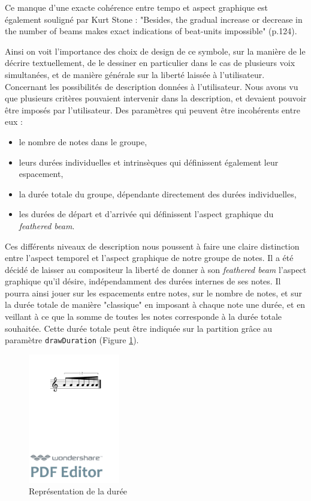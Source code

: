 \documentclass{article}
\newenvironment{gmncode}	{\vspace{-2mm}\small\verbatim}{\endverbatim\vspace{-2mm}}
\newcommand{\code}[1]		{{\small \texttt{#1}}}
\begin{document}
Ce manque d'une exacte cohérence entre tempo et aspect graphique est également souligné par Kurt Stone \cite{stone1980music} : "Besides, the gradual increase or decrease in the number of beams makes exact indications of beat-units impossible" (p.124).

Ainsi on voit l'importance des choix de design de ce symbole, sur la manière de le décrire textuellement, de le dessiner en particulier dans le cas de plusieurs voix simultanées, et de manière générale sur la liberté laissée à l'utilisateur.
\\

Concernant les possibilités de description données à l'utilisateur. Nous avons vu que plusieurs critères pouvaient intervenir dans la description, et devaient pouvoir être imposés par l'utilisateur. Des paramètres qui peuvent être incohérents entre eux :
\begin{itemize}
\item le nombre de notes dans le groupe,
\item leurs durées individuelles et intrinsèques qui définissent également leur espacement,
\item la durée totale du groupe, dépendante directement des durées individuelles,
\item les durées de départ et d'arrivée qui définissent l'aspect graphique du \emph{feathered beam}.
\end{itemize}
\bigskip

Ces différents niveaux de description nous poussent à faire une claire distinction entre l'aspect temporel et l'aspect graphique de notre groupe de notes.  Il a été décidé de laisser au compositeur la liberté de donner à son \emph{feathered beam} l'aspect graphique qu'il désire, indépendamment des durées internes de ses notes. Il pourra ainsi jouer sur les espacements entre notes, sur le nombre de notes, et sur la durée totale de manière "classique" en imposant à chaque note une durée, et en veillant à ce que la somme de toutes les notes corresponde à la durée totale souhaitée. Cette durée totale peut être indiquée sur la partition grâce au paramètre \code{drawDuration} (Figure \ref{fig:fbeamduree}).

\begin{figure}[h]
\centering
\begin{gmncode}
[ 
  \fBeam<drawDuration="true">
  ( a/8 a a/16 a a a/32 a ) 
]
\end{gmncode}
\includegraphics[width=40mm]{img/fbeamduree.pdf}
\caption{Représentation de la durée}
\label{fig:fbeamduree}
\end{figure}
\end{document}
